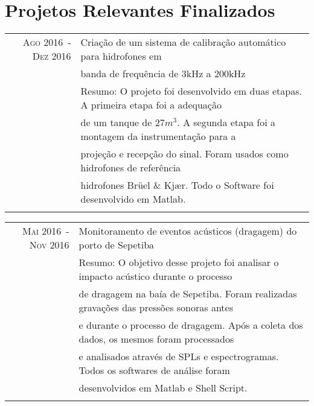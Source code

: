 \documentclass[a4paper,10pt]{article}
\begin{document}
\section{Projetos Relevantes Finalizados}
\begin{tabular}{rl}

    \textsc{Ago 2016~-~Dez 2016}    & Criação de um sistema de calibração automático para hidrofones em \\
                                    & banda de frequência de 3kHz a 200kHz \\
                                    &\footnotesize{Resumo: O projeto foi desenvolvido em duas etapas. A primeira etapa foi a adequação}\\
                                    &\footnotesize{de um tanque de $27m^3$. A segunda etapa foi a montagem da instrumentação para a}\\
                                    &\footnotesize{projeção e recepção do sinal. Foram usados como hidrofones de referência}\\
                                    &\footnotesize{hidrofones Brüel \& Kjær. Todo o Software foi desenvolvido em Matlab.} \\
                                    &\\
\end{tabular}
\begin{tabular}{rl}

    \textsc{Mai 2016~-~Nov 2016}    & Monitoramento de eventos acústicos (dragagem) do porto de Sepetiba\\
                                    &\footnotesize{Resumo: O objetivo desse projeto foi analisar o impacto acústico durante o processo}\\
                                    &\footnotesize{de dragagem na baía de Sepetiba. Foram realizadas gravações das pressões sonoras antes}\\
                                    &\footnotesize{e durante o processo de dragagem. Após a coleta dos dados, os mesmos foram processados}\\ 
                                    &\footnotesize{e analisados através de SPLs e espectrogramas. Todos os softwares de análise foram }\\
                                    &\footnotesize{desenvolvidos em Matlab e Shell Script.} \\
                                    &\\

\end{tabular}
\end{document}
